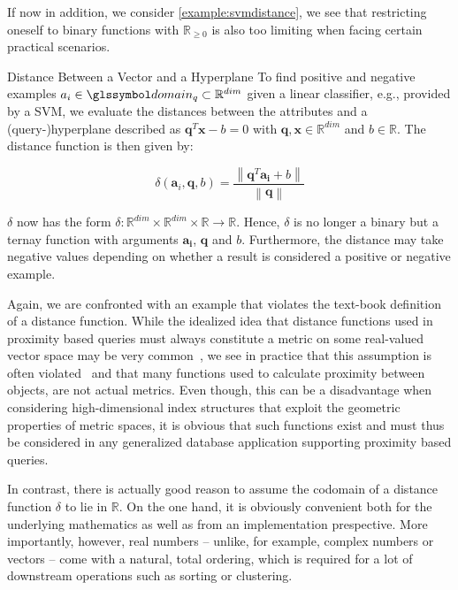 If now in addition, we consider \cref{example:svmdistance}, we see that restricting oneself to binary functions with $\mathbb{R}_{\geq 0}$ is also too limiting when facing certain practical scenarios.

\begin{example}[label=example:svmdistance]{Distance Between a Vector and a Hyperplane}{}
    To find positive and negative examples $a_{i} \in \domain_q \subset \mathbb{R}^{dim}$ given a linear classifier, e.g., provided by a SVM, we evaluate the distances between the attributes and a (query-)hyperplane described as $\mathbf{q}^T\mathbf{x} - b = 0$ with $\mathbf{q},\mathbf{x} \in \mathbb{R}^{dim}$ and $b \in \mathbb{R}$. The distance function is then given by:

    \begin{equation}
        \delta (\mathbf{a}_i, \mathbf{q}, b) = \frac{\left\|\mathbf{q}^T \mathbf{a_i} + b \right\|}{\left\|\mathbf{q}\right\|}
    \end{equation}
    
    $\delta$ now has the form $\delta \colon \mathbb{R}^{dim} \times \mathbb{R}^{dim} \times \mathbb{R} \to \mathbb{R}$. Hence, $\delta$ is no longer a binary but a ternay function with arguments $\mathbf{a_{i}}$, $\mathbf{q}$ and $b$. Furthermore, the distance may take negative values depending on whether a result is considered a positive or negative example.
\end{example}


Again, we are confronted with an example that violates the text-book definition of a distance function. While the idealized idea that distance functions used in proximity based queries must always constitute a metric on some real-valued vector space may be very common~\cite{Zezula:2006Similarity}, we see in practice that this assumption is often violated~\cite{Bernhauer:2019Nonmetric}  and that many functions used to calculate proximity between objects, are not actual metrics. Even though, this can be a disadvantage when considering high-dimensional index structures that exploit the geometric properties of metric spaces, it is obvious that such functions exist and must thus be considered in any generalized database application supporting proximity based queries. 

In contrast, there is actually good reason to assume the codomain of a distance function  $\delta$ to lie in $\mathbb{R}$. On the one hand, it is obviously convenient both for the underlying mathematics as well as from an implementation prespective. More importantly, however, real numbers -- unlike, for example, complex numbers or vectors -- come with a natural, total ordering, which is required for a lot of downstream operations such as sorting or clustering.

